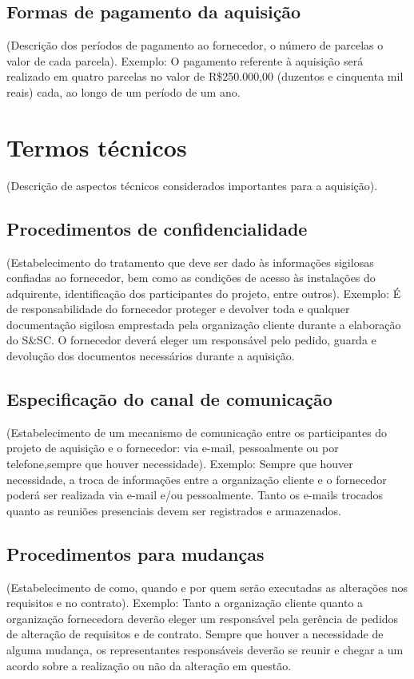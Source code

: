 \subsection{Formas de pagamento da aquisição}
(Descrição dos períodos de pagamento ao fornecedor, o número de parcelas
o valor de cada parcela).
Exemplo: O pagamento referente à aquisição será realizado em quatro
parcelas no valor de R\$250.000,00 (duzentos e cinquenta mil reais) cada, ao
longo de um período de um ano.

\section{Termos técnicos}
(Descrição de aspectos técnicos considerados importantes para a aquisição).

\subsection{Procedimentos de confidencialidade}
(Estabelecimento do tratamento que deve ser dado às informações
sigilosas confiadas ao fornecedor, bem como as condições de acesso às
instalações do adquirente, identificação dos participantes do projeto, entre
outros).
Exemplo: É de responsabilidade do fornecedor proteger e devolver toda e
qualquer documentação sigilosa emprestada pela organização cliente durante
a elaboração do S\&SC. O fornecedor deverá eleger um responsável pelo
pedido, guarda e devolução dos documentos necessários durante a
aquisição.

\subsection{Especificação do canal de comunicação}
(Estabelecimento de um mecanismo de comunicação entre os
participantes do projeto de aquisição e o fornecedor: via e-mail, pessoalmente
ou por telefone,sempre que houver necessidade).
Exemplo: Sempre que houver necessidade, a troca de informações entre a
organização cliente e o fornecedor poderá ser realizada via e-mail e/ou
pessoalmente. Tanto os e-mails trocados quanto as reuniões presenciais
devem ser registrados e armazenados.

\subsection{Procedimentos para mudanças}
(Estabelecimento de como, quando e por quem serão executadas as
alterações nos requisitos e no contrato).
Exemplo: Tanto a organização cliente quanto a organização fornecedora
deverão eleger um responsável pela gerência de pedidos de alteração de
requisitos e de contrato. Sempre que houver a necessidade de alguma
mudança, os representantes responsáveis deverão se reunir e chegar a um
acordo sobre a realização ou não da alteração em questão.

